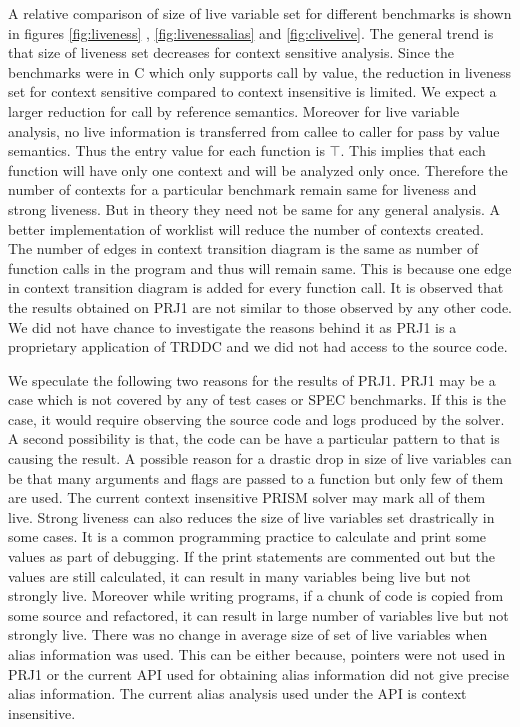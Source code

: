 \documentclass[12pt]{report}
\begin{document}
A relative comparison of size of live variable set for different benchmarks is shown in figures \ref{fig:liveness} , \ref{fig:livenessalias} and \ref{fig:clivelive}. The general trend is that size of liveness set decreases for context sensitive analysis. Since the benchmarks were in C which only supports call by value, the reduction in liveness set for context sensitive compared to context insensitive is limited. We expect a larger reduction for call by reference semantics. Moreover for live variable analysis, no live information is transferred from callee to caller for pass by value semantics. Thus the entry value for each function is $\top$. This implies that each function will have only one context and will be analyzed only once. Therefore the number of contexts for a particular benchmark remain same for liveness and strong liveness. But in theory they need not be same for any general analysis. A better implementation of worklist will reduce the number of contexts created. The number of edges in context transition diagram is the same as number of function calls in the program and thus will remain same. This is because one edge in context transition diagram is added for every function call.
\newline
It is observed that the results obtained on PRJ1 are not similar to those observed by any other code. We did not have chance to investigate the reasons behind it as PRJ1 is a proprietary application of TRDDC and we did not had access to the source code. 

We speculate the following two reasons for the results of PRJ1. PRJ1 may be a case which is not covered by any of test cases or SPEC benchmarks. If this is the case, it would require observing the source code and logs produced by the solver. A second possibility is that, the code can be have a particular pattern to that is causing the result. A possible reason for a drastic drop in size of live variables can be that many arguments and flags are passed to a function but only few of them are used. The current context insensitive PRISM solver may mark all of them live. Strong liveness can also reduces the size of live variables set drastrically in some cases. It is a common programming practice to calculate and print some values as part of debugging. If the print statements are commented out but the values are still calculated, it can result in many variables being live but not strongly live. Moreover while writing programs, if a chunk of code is copied from some source and refactored, it can result in large number of variables live but not strongly live. There was no change in average size of set of live variables when alias information was used. This can be either because, pointers were not used in PRJ1 or the current API used for obtaining alias information did not give precise alias information. The current alias analysis used under the API is context insensitive.
\end{document}
